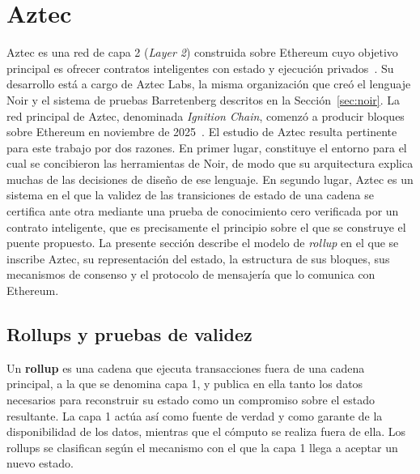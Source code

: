 \section{Aztec}
\label{sec:aztec}

Aztec es una red de capa 2 (\textit{Layer 2}) construida sobre Ethereum cuyo objetivo principal es
ofrecer contratos inteligentes con estado y ejecución privados~\cite{aztecdocs}. Su desarrollo
está a cargo de Aztec Labs, la misma organización que creó el lenguaje Noir y el sistema de
pruebas Barretenberg descritos en la Sección~\ref{sec:noir}. La red principal de Aztec, denominada
\textit{Ignition Chain}, comenzó a producir bloques sobre Ethereum en noviembre de
2025~\cite{theblock2025aztec}. El estudio de Aztec resulta pertinente para este trabajo por dos
razones. En primer lugar, constituye el entorno para el cual se concibieron las herramientas de
Noir, de modo que su arquitectura explica muchas de las decisiones de diseño de ese lenguaje. En
segundo lugar, Aztec es un sistema en el que la validez de las transiciones de estado de una
cadena se certifica ante otra mediante una prueba de conocimiento cero verificada por un contrato
inteligente, que es precisamente el principio sobre el que se construye el puente propuesto. La
presente sección describe el modelo de \textit{rollup} en el que se inscribe Aztec, su
representación del estado, la estructura de sus bloques, sus mecanismos de consenso y el
protocolo de mensajería que lo comunica con Ethereum.

\subsection{Rollups y pruebas de validez}
\label{sec:aztec_rollups}

Un \textbf{rollup} es una cadena que ejecuta transacciones fuera de una cadena principal, a la
que se denomina capa 1, y publica en ella tanto los datos necesarios para reconstruir su estado
como un compromiso sobre el estado resultante. La capa 1 actúa así como fuente de verdad y como
garante de la disponibilidad de los datos, mientras que el cómputo se realiza fuera de ella. Los
rollups se clasifican según el mecanismo con el que la capa 1 llega a aceptar un nuevo estado.

